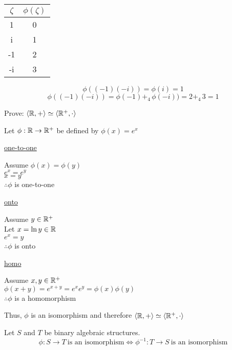 \documentclass[letterpaper,12pt,fleqn]{article}
\newcommand{\bas}[2]{\left<#1,#2\right>}
\newcommand{\p}{\phi}
\newcommand{\z}{\zeta}
\begin{document}
\begin{example}
\bigskip

\begin{tabular}{c|c}
$\z$ & $\p(\z)$ \\
\hline
1 & 0 \\
i & 1 \\
-1 & 2 \\
-i & 3 \\
\end{tabular}

\[\p((-1)(-i))=\p(i)=1\]
\[\p((-1)(-i))=\p(-1)+_4\,\p(-i))=2+_4\,3=1\]
\end{example}

\begin{example}
Prove: $\bas{\R}{+}\simeq\bas{\R^+}{\cdot}$

Let $\p:\R\to\R^+$ be defined by $\p(x)=e^x$

\bigskip

\begin{minipage}{2.5in}
\underline{one-to-one}

Assume $\p(x)=\p(y)$ \\
$e^x=e^y$ \\
$x=y$ \\
$\therefore \p$ is one-to-one
\end{minipage}
\begin{minipage}{2.5in}
\underline{onto}

Assume $y\in\mathbb{R}^+$ \\
Let $x=\ln{y}\in\mathbb{R}$ \\
$e^x=y$ \\
$\therefore \p$ is onto
\end{minipage}

\bigskip

\underline{homo}

Assume $x,y\in\mathbb{R}^+$ \\
$\p(x+y)=e^{x+y}=e^xe^y=\p(x)\p(y)$ \\
$\therefore \p$ is a homomorphism

\bigskip

Thus, $\p$ is an isomorphism and therefore
$\bas{\R}{+}\simeq\bas{\R^+}{\cdot}$
\end{example}

\begin{theorem}
Let $S$ and $T$ be binary algebraic structures.
\[\p:S\to T\ \mbox{is an isomorphism}\iff
    \p^{-1}:T\to S\ \mbox{is an isomorphism}\]
\end{theorem}
\end{document}
